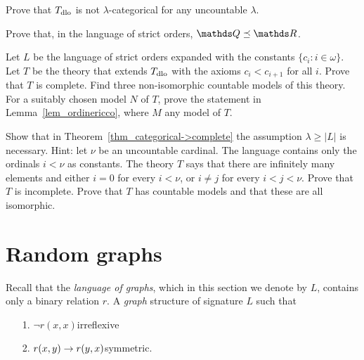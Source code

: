 \begin{exercise}\label{ex_dlo_notcategorical}
Prove that $T_{\rm dlo}$ is not $\lambda$-categorical for any uncountable $\lambda$.
\end{exercise}

\begin{exercise}
Prove that, in the language of strict orders, $\QQ\preceq\RR$.
\end{exercise}

\begin{exercise}\label{VaughtEsempio3modelli}
Let $L$ be the language of strict orders expanded with the constants $\big\{c_i: i\in\omega\big\}$.
Let $T$ be the theory that extends $T_{\rm dlo}$ with the axioms $c_i<c_{i+1}$ for all $i$.
Prove that $T$ is complete.
Find three non-isomorphic countable models of this theory.
For a suitably chosen model $N$ of $T$, prove the statement in Lemma~\ref{lem_ordinericco}, where $M$ any model of $T$.
\end{exercise}


\begin{exercise}\label{categorica->completa}
Show that in Theorem~\ref{thm_categorical->complete} the assumption $\lambda\ge|L|$ is necessary.
Hint: let $\nu$ be an uncountable cardinal.
The language contains only the ordinals $i<\nu$ as constants.
The theory $T$ says that there are infinitely many elements and either $i=0$ for every $i<\nu$, or $i\neq j$ for every $i<j<\nu$.
Prove that $T$ is incomplete.
Prove that $T$ has countable models and that these are all isomorphic.
\end{exercise}

\section{Random graphs}
\label{randomgraph}

Recall that the \emph{language of graphs}, which in this section we denote by $L$, contains only a binary relation $r$.
A \emph{graph\/} structure of signature $L$ such that

\begin{itemize}
\item[1.] $\neg r(x,x)$\hfill irreflexive
\item[2.] $r(x,y)\rightarrow r(y,x)$\hfill symmetric.
\end{itemize}

